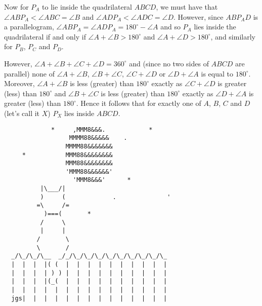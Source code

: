 \documentclass[a4paper,12pt]{article}
\begin{document}
\begin{enumerate}
  Now for $P_A$ to lie inside the quadrilateral $ABCD$, we must have that $\angle ABP_A < \angle ABC = \angle B$ and $\angle ADP_A < \angle ADC = \angle D$. However, since $ABP_AD$ is a parallelogram, $\angle ABP_A = \angle ADP_A = 180^\circ - \angle A$ and so $P_A$ lies inside the quadrilateral if and only if $\angle A + \angle B > 180^\circ$ and $\angle A + \angle D > 180^\circ$, and similarly for $P_B$, $P_C$ and $P_D$.
  
  However, $\angle A + \angle B + \angle C + \angle D = 360^\circ$ and (since no two sides of $ABCD$ are parallel) none of $\angle A + \angle B$, $\angle B + \angle C$, $\angle C + \angle D$ or $\angle D + \angle A$ is equal to $180^\circ$. Moreover, $\angle A + \angle B$ is less (greater) than $180^\circ$ exactly as $\angle C + \angle D$ is greater (less) than $180^\circ$ and $\angle B + \angle C$ is less (greater) than $180^\circ$ exactly as $\angle D + \angle A$ is greater (less) than $180^\circ$. Hence it follows that for exactly one of $A$, $B$, $C$ and $D$ (let's call it $X$) $P_X$ lies inside $ABCD$.
  
  
\end{enumerate}


\vspace{6cm}
\centering
\begin{BVerbatim}
             *     ,MMM8&&&.            *
                  MMMM88&&&&&    .
                 MMMM88&&&&&&&
     *           MMM88&&&&&&&&
                 MMM88&&&&&&&&
                 'MMM88&&&&&&'
                   'MMM8&&&'      *
          |\___/|
          )     (             .              '
         =\     /=
           )===(       *
          /     \
          |     |
         /       \
         \       /
  _/\_/\_/\__  _/_/\_/\_/\_/\_/\_/\_/\_/\_/\_
  |  |  |  |( (  |  |  |  |  |  |  |  |  |  |
  |  |  |  | ) ) |  |  |  |  |  |  |  |  |  |
  |  |  |  |(_(  |  |  |  |  |  |  |  |  |  |
  |  |  |  |  |  |  |  |  |  |  |  |  |  |  |
  jgs|  |  |  |  |  |  |  |  |  |  |  |  |  |
\end{BVerbatim}
\end{document}
